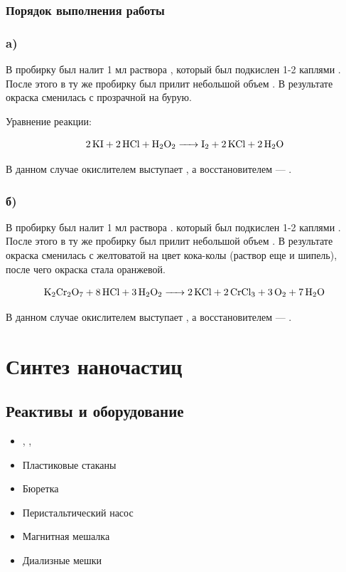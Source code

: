 \documentclass[a4paper, 12pt]{article}
\begin{document}
\subsubsection{Порядок выполнения работы}

\subsubsection*{a)}

В пробирку был налит 1 мл раствора , который был подкислен 1-2 каплями . После этого в ту же пробирку был прилит небольшой объем . В результате окраска сменилась с прозрачной на бурую.

Уравнение реакции:

\begin{equation}
	\ce{2 KI + 2 HCl + H2O2 -> I2 + 2 KCl + 2H2O}
\end{equation}

В данном случае окислителем выступает , а восстановителем --- .

\subsubsection*{б)}

В пробирку был налит 1 мл раствора . который был подкислен 1-2 каплями . После этого в ту же пробирку был прилит небольшой объем . В результате окраска сменилась с желтоватой на цвет кока-колы (раствор еще и шипель), после чего окраска стала оранжевой.

\begin{equation}
	\ce{K2Cr2O7 + 8 HCl + 3 H2O2 -> 2KCl + 2CrCl3 + 3O2 + 7H2O}
\end{equation}

В данном случае окислителем выступает , а восстановителем --- .

\section{Синтез наночастиц }

\subsection{Реактивы и оборудование}

\begin{itemize}
	\item {}, , 
	
	\item Пластиковые стаканы
	\item Бюретка
	\item Перистальтический насос
	\item Магнитная мешалка
	\item Диализные мешки
\end{itemize}
\end{document}
